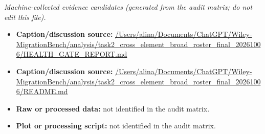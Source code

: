 \emph{Machine-collected evidence candidates (generated from the audit matrix; do not edit this file).}
\begin{itemize}[leftmargin=1.4em,noitemsep]
\item \textbf{Caption/discussion source:} \url{/Users/alina/Documents/ChatGPT/Wiley-MigrationBench/analysis/task2_cross_element_broad_roster_final_20261006/HEALTH_GATE_REPORT.md}
\item \textbf{Caption/discussion source:} \url{/Users/alina/Documents/ChatGPT/Wiley-MigrationBench/analysis/task2_cross_element_broad_roster_final_20261006/README.md}
\item \textbf{Raw or processed data:} not identified in the audit matrix.
\item \textbf{Plot or processing script:} not identified in the audit matrix.
\end{itemize}
